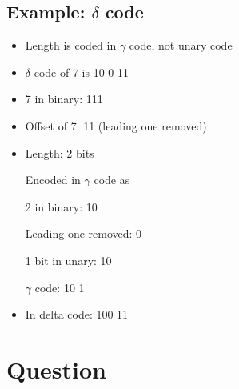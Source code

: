 \documentclass[12pt]{article}
\begin{document}
\subsection{Example: $\delta$ code}

\begin{itemize}
  \item Length is coded in $\gamma$ code, not unary code 
  \item $\delta$ code of 7 is 10 0 11
  \item 7 in binary: 111
  \item Offset of 7: 11 (leading one removed)
  \item Length: 2 bits

	 Encoded in $\gamma$ code as 

	 2 in binary: 10
	
	 Leading one removed: 0

	 1 bit in unary: 10

	 $\gamma$ code: 10 1
  \item In delta code: 100 11
\end{itemize}


\section{Question}
\end{document}
